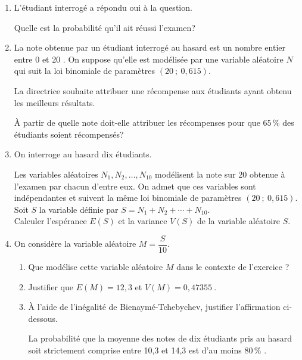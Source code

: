 \documentclass[10pt]{article}
\providecommand{\np}[2][]{{#2~#1}}
\begin{document}
\begin{enumerate}
\begin{enumerate}
		\item  Montrer que $x=0,9$.
	\end{enumerate}

	\item L'étudiant interrogé a répondu \og oui\fg{}  à la question.
	
Quelle est la probabilité qu'il ait réussi l'examen?

	\item La note obtenue par un étudiant interrogé au hasard est un nombre entier entre 0 et 20 . On suppose qu'elle est modélisée par une variable aléatoire $N$ qui suit la loi binomiale de paramètres $(20 ~;~0,615)$.
	
	La directrice souhaite attribuer une récompense aux étudiants ayant
obtenu les meilleurs résultats.

À partir de quelle note doit-elle attribuer les récompenses pour que $65\,\%$ des étudiants soient récompensés?

	\item On interroge au hasard dix étudiants.
	
Les variables aléatoires $N_{1}, N_{2}, \ldots, N_{10}$ modélisent la note sur 20 obtenue à l'examen par chacun d'entre eux. On admet que ces variables sont indépendantes et suivent la même loi binomiale de paramètres $(20 ~;~ 0,615)$.\\
	Soit $S$ la variable définie par $S=N_{1}+N_{2}+\cdots+N_{10}$.\\
	Calculer l'espérance $E(S)$ et la variance $V(S)$ de la variable aléatoire $S$.


	\item On considère la variable aléatoire $M=\dfrac{S}{10}$.
	\begin{enumerate}
		\item Que modélise cette variable aléatoire $M$ dans le contexte de l'exercice ?
		\item Justifier que $E(M)=12,3$ et $V(M)=\np{0,47355}$.
		\item À l'aide de l'inégalité de Bienaymé-Tchebychev, justifier l'affirmation ci-dessous.

\smallskip

\og La probabilité que la moyenne des notes de dix étudiants pris au hasard soit strictement comprise entre 10,3 et 14,3 est d'au moins $80\,\%$ \fg.
	\end{enumerate}
\end{enumerate}

\medskip
\end{document}
